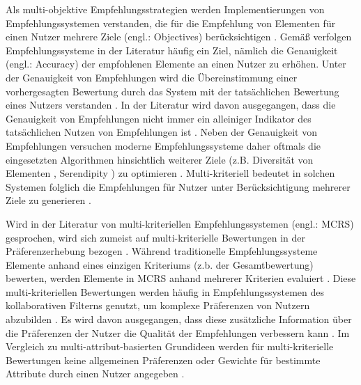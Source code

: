 Als multi-objektive Empfehlungsstrategien werden Implementierungen von Empfehlungssystemen verstanden, die für die Empfehlung von Elementen für einen Nutzer mehrere Ziele (engl.: Objectives) berücksichtigen \cite[S. 850]{adomavicius:4:inbook}.
Gemäß \textcite[S. 1097]{mcnee:inproceedings} verfolgen Empfehlungssysteme in der Literatur häufig ein Ziel, nämlich die Genauigkeit (engl.: Accuracy) der empfohlenen Elemente an einen Nutzer zu erhöhen.
Unter der Genauigkeit von Empfehlungen wird die Übereinstimmung einer vorhergesagten Bewertung durch das System mit der tatsächlichen Bewertung eines Nutzers verstanden \cite[S. 1098]{mcnee:inproceedings}.
In der Literatur wird davon ausgegangen, dass die Genauigkeit von Empfehlungen nicht immer ein alleiniger Indikator des tatsächlichen Nutzen von Empfehlungen ist \cite[S. 1097]{mcnee:inproceedings}\cite[S. 850]{adomavicius:4:inbook}\cite[S. 896]{adomavicius:article}.
Neben der Genauigkeit von Empfehlungen versuchen moderne Empfehlungssysteme daher oftmals die eingesetzten Algorithmen hinsichtlich weiterer Ziele (z.B. Diversität von Elementen \cite[S. 896]{adomavicius:article}, Serendipity \cite[S. 1099]{mcnee:inproceedings}) zu optimieren \cite[S. 850]{adomavicius:4:inbook}.
Multi-kriteriell bedeutet in solchen Systemen folglich die Empfehlungen für Nutzer unter Berücksichtigung mehrerer Ziele zu generieren \cite[S. 850]{adomavicius:4:inbook}.

Wird in der Literatur von multi-kriteriellen Empfehlungssystemen (engl.: \ac{MCRS}) gesprochen, wird sich zumeist auf multi-kriterielle Bewertungen in der Präferenzerhebung bezogen \cite[S. 207]{hdioud:inproceedings}\cite[S. 1156]{gupta:inproceedings}\cite[S. 327]{hassan:inproceedings}\cite[S. 2453]{zheng:inproceedings}.
Während traditionelle Empfehlungssysteme Elemente anhand eines einzigen Kriteriums (z.b. der Gesamtbewertung) bewerten, werden Elemente in \ac{MCRS} anhand mehrerer Kriterien evaluiert \cite[S. 850]{adomavicius:4:inbook}\cite[S. 2]{adomavicius:5:inbook}.
Diese multi-kriteriellen Bewertungen werden häufig in Empfehlungssystemen des kollaborativen Filterns genutzt, um komplexe Präferenzen von Nutzern abzubilden \cite[S. 850]{adomavicius:4:inbook}.
Es wird davon ausgegangen, dass diese zusätzliche Information \cite[S. 49]{adomavicius:inproceedings:2} über die Präferenzen der Nutzer die Qualität der Empfehlungen verbessern kann \cite[S. 2]{adomavicius:5:inbook}.
Im Vergleich zu multi-attribut-basierten Grundideen werden für multi-kriterielle Bewertungen keine allgemeinen Präferenzen oder Gewichte für bestimmte Attribute durch einen Nutzer angegeben \cite[S. 851]{adomavicius:4:inbook}.

